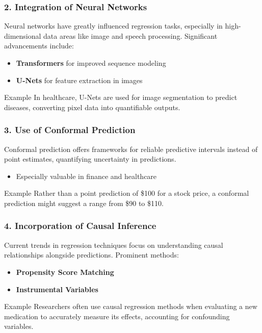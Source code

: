 \documentclass[aspectratio=169]{beamer}
\begin{document}
\begin{frame}[fragile]
    \frametitle{2. Integration of Neural Networks}
    Neural networks have greatly influenced regression tasks, especially in high-dimensional data areas like image and speech processing. 
    Significant advancements include:
    \begin{itemize}
        \item \textbf{Transformers} for improved sequence modeling
        \item \textbf{U-Nets} for feature extraction in images
    \end{itemize}
    
    \begin{block}{Example}
        In healthcare, U-Nets are used for image segmentation to predict diseases, converting pixel data into quantifiable outputs.
    \end{block}
\end{frame}

\begin{frame}[fragile]
    \frametitle{3. Use of Conformal Prediction}
    Conformal prediction offers frameworks for reliable predictive intervals instead of point estimates, quantifying uncertainty in predictions.
    \begin{itemize}
        \item Especially valuable in finance and healthcare
    \end{itemize}
    
    \begin{block}{Example}
        Rather than a point prediction of \$100 for a stock price, a conformal prediction might suggest a range from \$90 to \$110.
    \end{block}
\end{frame}

\begin{frame}[fragile]
    \frametitle{4. Incorporation of Causal Inference}
    Current trends in regression techniques focus on understanding causal relationships alongside predictions. 
    Prominent methods:
    \begin{itemize}
        \item \textbf{Propensity Score Matching}
        \item \textbf{Instrumental Variables}
    \end{itemize}
    
    \begin{block}{Example}
        Researchers often use causal regression methods when evaluating a new medication to accurately measure its effects, accounting for confounding variables.
    \end{block}
\end{frame}
\end{document}
